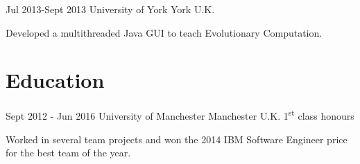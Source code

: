 \documentclass[10pt]{CurriculumVitae}
\begin{document}
      {Jul 2013-Sept 2013}
      {University of York}
      {York}
      {U.K.}
      {
        \item Developed a multithreaded Java GUI to teach Evolutionary Computation.
      } 


  \section{Education}
   
      {Sept 2012 - Jun 2016}
      {University of Manchester}
      {Manchester}
      {U.K.}
      {1\textsuperscript{st} class honours}
      {
         \item Worked in several team projects and won the 2014 IBM Software Engineer price for the best team of the year.
      }
\end{document}
